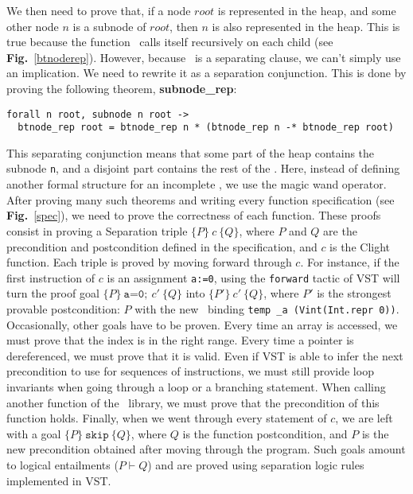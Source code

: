 We then need to prove that, if a node $root$ is represented in the heap, and some other node $n$ is a subnode of $root$, then $n$ is also represented in the heap.
This is true because the function \btrep\ calls itself recursively on each child (see \textbf{Fig.}~\ref{btnoderep}).
However, because \btrep\ is a separating clause, we can't simply use an implication. We need to rewrite it as a separation conjunction.
This is done by proving the following theorem, \textbf{subnode\_rep}:

\begin{lstlisting}[language=Coq]
  forall n root, subnode n root ->
  btnode_rep root = btnode_rep n * (btnode_rep n -* btnode_rep root)
\end{lstlisting}

This separating conjunction means that some part of the heap contains the subnode \texttt{n}, and a disjoint part contains the rest of the \btree.
Here, instead of defining another formal structure for an incomplete \btree, we use the magic wand operator.
After proving many such theorems and writing every function specification (see \textbf{Fig.}~\ref{spec}), we need to prove the correctness of each function.
These proofs consist in proving a Separation triple $\{P\}~c~\{Q\}$, where $P$ and $Q$ are the precondition and postcondition defined in the specification, and $c$ is the Clight function.
Each triple is proved by moving forward through $c$.
For instance, if the first instruction of $c$ is an assignment \texttt{a:=0}, using the \lstinline[language=Coq]{forward} tactic of VST will turn the proof goal $\{P\}~\texttt{a=0};~c'~\{Q\}$ into $\{P'\}~c'~\{Q\}$,
where $P'$ is the strongest provable postcondition: $P$ with the new \local\ binding \texttt{temp \_a (Vint(Int.repr 0))}.
Occasionally, other goals have to be proven.
Every time an array is accessed, we must prove that the index is in the right range.
Every time a pointer is dereferenced, we must prove that it is valid.
Even if VST is able to infer the next precondition to use for sequences of instructions, we must still provide loop invariants when going through a loop or a branching statement.
When calling another function of the \btrees\ library, we must prove that the precondition of this function holds.
Finally, when we went through every statement of $c$, we are left with a goal $\{P\}~\texttt{skip}~\{Q\}$, where $Q$ is the function postcondition, and $P$ is the new precondition obtained after moving through the program.
Such goals amount to logical entailments ($P\vdash Q$) and are proved using separation logic rules implemented in VST.

